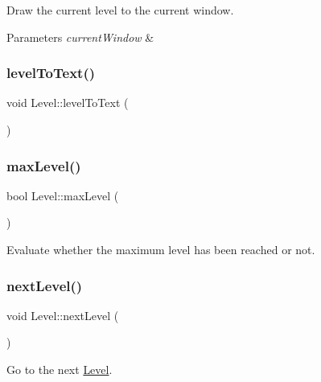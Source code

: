 Draw the current level to the current window. 


\begin{DoxyParams}{Parameters}
{\em current\+Window} & \\
\hline
\end{DoxyParams}
\mbox{\label{class_level_a0d5d67c406bf3ee9eb5be34718345b40}} 
\subsubsection{\texorpdfstring{level\+To\+Text()}{levelToText()}}
{\footnotesize\ttfamily void Level\+::level\+To\+Text (\begin{DoxyParamCaption}{ }\end{DoxyParamCaption})\hspace{0.3cm}{\ttfamily [private]}}

\mbox{\label{class_level_a702a1a057a4572ea37b701126501621a}} 
\subsubsection{\texorpdfstring{max\+Level()}{maxLevel()}}
{\footnotesize\ttfamily bool Level\+::max\+Level (\begin{DoxyParamCaption}{ }\end{DoxyParamCaption})}



Evaluate whether the maximum level has been reached or not. 

\mbox{\label{class_level_a9e00624c99565b0bc3cedf7b7971818e}} 
\subsubsection{\texorpdfstring{next\+Level()}{nextLevel()}}
{\footnotesize\ttfamily void Level\+::next\+Level (\begin{DoxyParamCaption}{ }\end{DoxyParamCaption})}



Go to the next \hyperlink{class_level}{Level}. 

